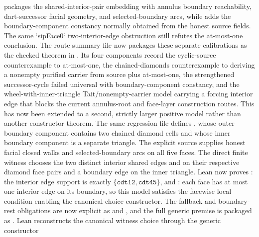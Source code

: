 \documentclass[11pt]{article}
\begin{document}
packages the shared-interior-pair embedding with annulus boundary reachability,
dart-successor facial geometry, and selected-boundary arcs, while
adds the boundary-component constancy normally obtained from the honest source
fields.  The same `sipFace0` two-interior-edge obstruction still refutes the
at-most-one conclusion.
The route summary file now packages these separate calibrations as the checked
theorem
 in
.  Its four components
record the cyclic-source counterexample to at-most-one, the chained-diamonds
counterexample to deriving a nonempty purified carrier from source plus
at-most-one, the strengthened successor-cycle failed universal with
boundary-component constancy, and the wheel-with-inner-triangle
Tait/nonempty-carrier model carrying a forcing interior edge that blocks the
current annulus-root and face-layer construction routes.
This has now been extended to a second, strictly larger positive model rather
than another constructor theorem.  The same regression file defines
, whose outer boundary component
contains two chained diamond cells and whose inner boundary component is a
separate triangle.  The explicit source
 supplies honest facial
closed walks and selected-boundary arcs on all five faces.  The direct finite
witness
 chooses the two
distinct interior shared edges  and  on their
respective diamond face pairs and a boundary edge on the inner triangle.  Lean
now proves : the
interior edge support is exactly \(\{\mathtt{cdt12}, \mathtt{cdt45}\}\), and
: each face has
at most one interior edge on its boundary, so this model satisfies the
facewise local condition enabling the canonical-choice constructor.  The
fallback and boundary-rest obligations are now explicit as
 and
, and the full generic premise is
packaged as
.
Lean reconstructs the canonical witness choice through the generic constructor
\end{document}
